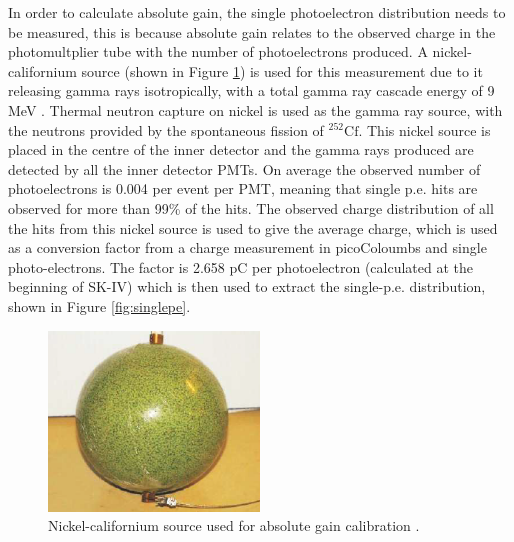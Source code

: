 In order to calculate absolute gain, the single photoelectron distribution needs to be measured, this is because absolute gain relates to the observed charge in the photomultplier tube with the number of photoelectrons produced. A nickel-californium source (shown in Figure \ref{fig:nickel_source}) is used for this measurement due to it releasing gamma rays isotropically, with a total gamma ray cascade energy of 9 MeV \cite{koshio1998study}. Thermal neutron capture on nickel is used as the gamma ray source, with the neutrons provided by the spontaneous fission of ${ }^{252} \mathrm{Cf}$. This nickel source is placed in the centre of the inner detector and the gamma rays produced are detected by all the inner detector PMTs. On average the observed number of photoelectrons is 0.004 per event per PMT, meaning that single p.e. hits are observed for more than 99\% of the hits. The observed charge distribution of all the hits from this nickel source is used to give the average charge, which is used as a conversion factor from a charge measurement in picoColoumbs and single photo-electrons. The factor is 2.658 pC per photoelectron (calculated at the beginning of SK-IV) which is then used to extract the single-p.e. distribution, shown in Figure \ref{fig:singlepe}.

\begin{figure}
    \centering
        \includegraphics[width=0.5\textwidth]{Figures/nickel_source.png}
    \caption[Nickel-californium source used for absolute gain calibration.]{Nickel-californium source used for absolute gain calibration \cite{abe_calibration_2014}.}
        \label{fig:nickel_source}
\end{figure}

